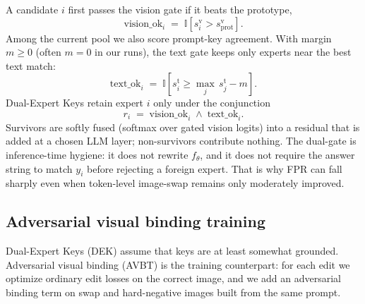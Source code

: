 \documentclass[letterpaper]{article} %
\begin{document}
A candidate $i$ first passes the vision gate if it beats the prototype,
\begin{equation}
\mathrm{vision\_ok}_i
\;=\;
\mathbb{I}\!\left[s^{\mathrm{v}}_i > s^{\mathrm{v}}_{\mathrm{prot}}\right].
\label{eq:vision-gate}
\end{equation}
Among the current pool we also score prompt-key agreement.
With margin $m\!\ge\!0$ (often $m{=}0$ in our runs), the text gate keeps only experts near the best text match:
\begin{equation}
\mathrm{text\_ok}_i
\;=\;
\mathbb{I}\!\left[s^{\mathrm{t}}_i \ge \max_{j}\,s^{\mathrm{t}}_j - m\right].
\label{eq:text-gate}
\end{equation}
Dual-Expert Keys retain expert $i$ only under the conjunction
\begin{equation}
r_i
\;=\;
\mathrm{vision\_ok}_i \;\wedge\; \mathrm{text\_ok}_i.
\label{eq:dek}
\end{equation}
Survivors are softly fused (softmax over gated vision logits) into a residual that is added at a chosen LLM layer; non-survivors contribute nothing.
The dual-gate is inference-time hygiene: it does not rewrite $f_\theta$, and it does not require the answer string to match $y_i$ before rejecting a foreign expert.
That is why FPR can fall sharply even when token-level image-swap remains only moderately improved.


\subsection{Adversarial visual binding training}
Dual-Expert Keys (DEK) assume that keys are at least somewhat grounded.
Adversarial visual binding (AVBT) is the training counterpart: for each edit we optimize ordinary edit losses on the correct image, and we add an adversarial binding term on swap and hard-negative images built from the same prompt.
\end{document}

